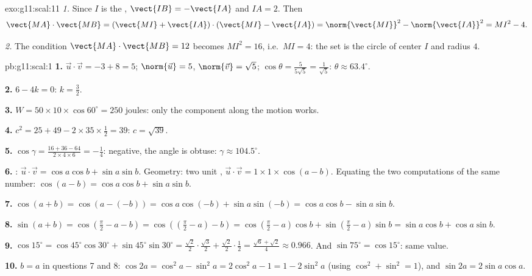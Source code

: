 \begin{solution}{exo:g11:scal:11}
\emph{1.} Since $I$ is the , $\vect{IB} = -\vect{IA}$ and
$IA = 2$. Then
\[
\vect{MA}\cdot\vect{MB}
= (\vect{MI} + \vect{IA})\cdot(\vect{MI} - \vect{IA})
= \norm{\vect{MI}}^2 - \norm{\vect{IA}}^2
= MI^2 - 4 .
\]

\emph{2.} The condition $\vect{MA}\cdot\vect{MB} = 12$ becomes
$MI^2 = 16$, i.e.\ $MI = 4$: the set is the circle of center $I$ and
radius $4$.
\end{solution}

\begin{solution}{pb:g11:scal:1}
\textbf{1.} $\vec u \cdot \vec v = -3 + 8 = 5$;
$\norm{\vec u} = 5$, $\norm{\vec v} = \sqrt5$;
$\cos\theta = \frac{5}{5\sqrt5} = \frac{1}{\sqrt5}$:
$\theta \approx 63.4^\circ$.

\textbf{2.} $6 - 4k = 0$: $k = \frac32$.

\textbf{3.} $W = 50 \times 10 \times \cos 60^\circ = 250$
joules: only the component along the motion works.

\textbf{4.} $c^2 = 25 + 49 - 2 \times 35 \times \frac12 = 39$:
$c = \sqrt{39}$.

\textbf{5.} $\cos\gamma = \frac{16 + 36 - 64}{2 \times 4
\times 6} = -\frac14$: negative, the angle is obtuse:
$\gamma \approx 104.5^\circ$.

\textbf{6.} : $\vec u \cdot \vec v = \cos a \cos b +
\sin a \sin b$. Geometry: two unit ,
$\vec u \cdot \vec v = 1 \times 1 \times \cos(a - b)$.
Equating the two computations of the same number:
$\cos(a - b) = \cos a \cos b + \sin a \sin b$.

\textbf{7.} $\cos(a + b) = \cos(a - (-b)) = \cos a \cos(-b) +
\sin a \sin(-b) = \cos a \cos b - \sin a \sin b$.

\textbf{8.} $\sin(a + b) = \cos\left(\frac\pi2 - a - b\right)
= \cos\left(\left(\frac\pi2 - a\right) - b\right)
= \cos\left(\frac\pi2 - a\right)\cos b +
\sin\left(\frac\pi2 - a\right)\sin b
= \sin a \cos b + \cos a \sin b$.

\textbf{9.} $\cos 15^\circ = \cos 45^\circ \cos 30^\circ +
\sin 45^\circ \sin 30^\circ = \frac{\sqrt2}{2} \cdot
\frac{\sqrt3}{2} + \frac{\sqrt2}{2} \cdot \frac12 =
\frac{\sqrt6 + \sqrt2}{4} \approx 0.966$. And
$\sin 75^\circ = \cos 15^\circ$: same value.

\textbf{10.} $b = a$ in questions 7 and 8:
$\cos 2a = \cos^2 a - \sin^2 a = 2\cos^2 a - 1 = 1 - 2\sin^2 a$
(using $\cos^2 + \sin^2 = 1$), and
$\sin 2a = 2 \sin a \cos a$.


\end{solution}
